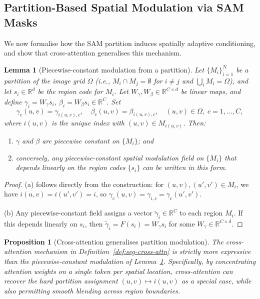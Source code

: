 \documentclass[12pt]{article}
\newtheorem{lemma}{Lemma}
\newtheorem{proposition}{Proposition}
\begin{document}
\subsection{Partition-Based Spatial Modulation via SAM Masks}
\label{sec:partition}

We now formalise how the SAM partition induces spatially adaptive
conditioning, and show that cross-attention generalises this mechanism.

\begin{lemma}[Piecewise-constant modulation from a partition]
\label{lem:partition}
Let $\{M_i\}_{i=1}^{N}$ be a partition of the image grid $\Omega$
(i.e., $M_i \cap M_j = \emptyset$ for $i \neq j$ and
$\bigcup_i M_i = \Omega$), and let $s_i \in \mathbb{R}^{d}$ be
the region code for $M_i$.
Let $W_\gamma, W_\beta \in \mathbb{R}^{C \times d}$ be linear maps,
and define
$\gamma_i = W_\gamma s_i$, $\beta_i = W_\beta s_i \in \mathbb{R}^C$.
Set
\begin{equation}\label{eq:pw-modulation}
    \gamma_c(u,v) = \gamma_{i(u,v),c}, \quad
    \beta_c(u,v) = \beta_{i(u,v),c},
    \quad (u,v) \in \Omega,\; c = 1,\ldots,C,
\end{equation}
where $i(u,v)$ is the unique index with $(u,v) \in M_{i(u,v)}$.
Then:
\begin{enumerate}
    \item[\textup{(a)}] $\gamma$ and $\beta$ are piecewise constant on
    $\{M_i\}$; and
    \item[\textup{(b)}] conversely, any piecewise-constant spatial modulation
    field on $\{M_i\}$ that depends linearly on the region codes
    $\{s_i\}$ can be written in this form.
\end{enumerate}
\end{lemma}

\begin{proof}
(a) follows directly from the construction: for $(u,v), (u',v') \in M_i$,
we have $i(u,v) = i(u',v') = i$, so $\gamma_c(u,v) = \gamma_{i,c} = \gamma_c(u',v')$.

(b) Any piecewise-constant field assigns a vector $\tilde{\gamma}_i \in \mathbb{R}^C$
to each region $M_i$.
If this depends linearly on $s_i$, then
$\tilde{\gamma}_i = F(s_i) = W_\gamma s_i$ for some $W_\gamma \in \mathbb{R}^{C \times d}$.
\end{proof}

\begin{proposition}[Cross-attention generalises partition modulation]
\label{prop:cross-attn-generalises}
The cross-attention mechanism in Definition~\ref{def:seg-cross-attn}
is strictly more expressive than the piecewise-constant modulation
of Lemma~\ref{lem:partition}.
Specifically, by concentrating attention weights on a single token per
spatial location, cross-attention can recover the hard partition assignment
$(u,v) \mapsto i(u,v)$ as a special case, while also permitting
smooth blending across region boundaries.
\end{proposition}
\end{document}
